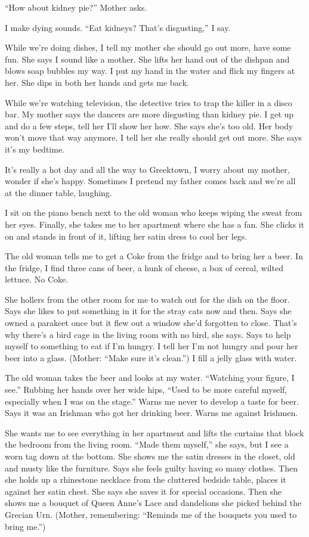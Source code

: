 \documentclass[
]{article}
\begin{document}
``How about kidney pie?'' Mother asks.

I make dying sounds. ``Eat kidneys? That's disgusting,'' I say.

While we're doing dishes, I tell my mother she should go out more, have
some fun. She says I sound like a mother. She lifts her hand out of the
dishpan and blows soap bubbles my way. I put my hand in the water and
flick my fingers at her. She dips in both her hands and gets me back.

While we're watching television, the detective tries to trap the killer
in a disco bar. My mother says the dancers are more disgusting than
kidney pie. I get up and do a few steps, tell her I'll show her how. She
says she's too old. Her body won't move that way anymore. I tell her she
really should get out more. She says it's my bedtime.

It's really a hot day and all the way to Greektown, I worry about my
mother, wonder if she's happy. Sometimes I pretend my father comes back
and we're all at the dinner table, laughing.

I sit on the piano bench next to the old woman who keeps wiping the
sweat from her eyes. Finally, she takes me to her apartment where she
has a fan. She clicks it on and stands in front of it, lifting her satin
dress to cool her legs.

The old woman tells me to get a Coke from the fridge and to bring her a
beer. In the fridge, I find three cans of beer, a hunk of cheese, a box
of cereal, wilted lettuce. No Coke.

She hollers from the other room for me to watch out for the dish on the
floor. Says she likes to put something in it for the stray cats now and
then. Says she owned a parakeet once but it flew out a window she'd
forgotten to close. That's why there's a bird cage in the living room
with no bird, she says. Says to help myself to something to eat if I'm
hungry. I tell her I'm not hungry and pour her beer into a glass.
(Mother: ``Make sure it's clean.'') I fill a jelly glass with water.

The old woman takes the beer and looks at my water. ``Watching your
figure, I see.'' Rubbing her hands over her wide hips, ``Used to be more
careful myself, especially when I was on the stage.'' Warns me never to
develop a taste for beer. Says it was an Irishman who got her drinking
beer. Warns me against Irishmen.

She wants me to see everything in her apartment and lifts the curtains
that block the bedroom from the living room. ``Made them myself,'' she
says, but I see a worn tag down at the bottom. She shows me the satin
dresses in the closet, old and musty like the furniture. Says she feels
guilty having so many clothes. Then she holds up a rhinestone necklace
from the cluttered bedside table, places it against her satin chest. She
says she saves it for special occasions. Then she shows me a bouquet of
Queen Anne's Lace and dandelions she picked behind the Grecian Urn.
(Mother, remembering: ``Reminds me of the bouquets you used to bring
me.'')
\end{document}
